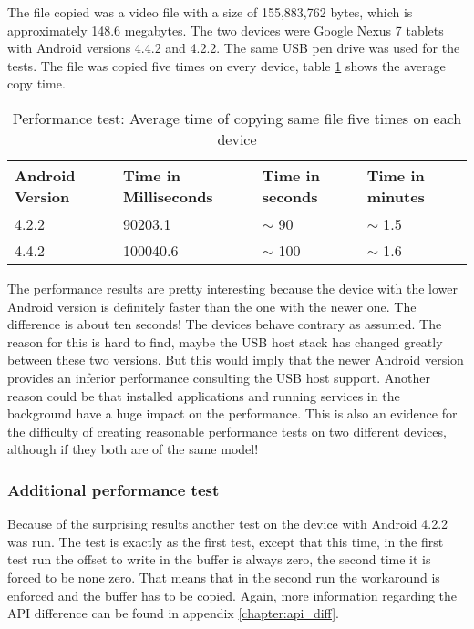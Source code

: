 The file copied was a video file with a size of 155,883,762 bytes, which is approximately 148.6 megabytes. The two devices were Google Nexus 7 tablets with Android versions 4.4.2 and 4.2.2. The same USB pen drive was used for the tests. The file was copied five times on every device, table \ref{table:performance_test} shows the average copy time.

\begin{table}[ht]
\caption{Performance test: Average time of copying same file five times on each device}
\centering
\begin{tabular}{|l|l|l|l|}
\hline\hline
\textbf{Android Version} & \textbf{Time in Milliseconds} & \textbf{Time in seconds} & \textbf{Time in minutes} \\ \hline
4.2.2 & 90203.1 & $\sim$ 90 & $\sim$ 1.5 \\ \hline
4.4.2 & 100040.6 & $\sim$ 100 & $\sim$ 1.6 \\ \hline
\end{tabular}
\label{table:performance_test}
\end{table}

The performance results are pretty interesting because the device with the lower Android version is definitely faster than the one with the newer one. The difference is about ten seconds! The devices behave contrary as assumed. The reason for this is hard to find, maybe the USB host stack has changed greatly between these two versions. But this would imply that the newer Android version provides an inferior performance consulting the USB host support. Another reason could be that installed applications and running services in the background have a huge impact on the performance. This is also an evidence for the difficulty of creating reasonable performance tests on two different devices, although if they both are of the same model!

\subsubsection{Additional performance test}

Because of the surprising results another test on the device with Android 4.2.2 was run. The test is exactly as the first test, except that this time, in the first test run the offset to write in the buffer is always zero, the second time it is forced to be none zero. That means that in the second run the workaround is enforced and the buffer has to be copied. Again, more information regarding the API difference can be found in appendix \ref{chapter:api_diff}.

